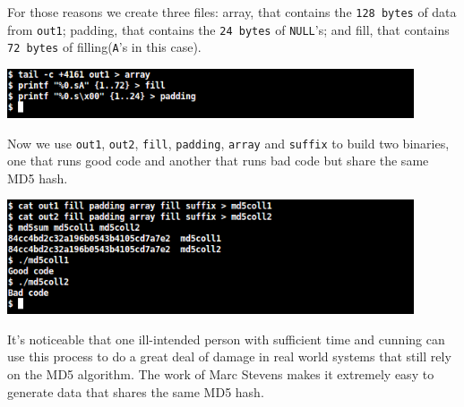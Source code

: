 \documentclass[a4paper]{article}
\begin{document}
\bigskip

For those reasons we create three files: array, that contains the \texttt{128 bytes} of data from \texttt{out1}; padding, that contains the \texttt{24 bytes} of \texttt{NULL}'s; and fill, that contains \texttt{72 bytes} of filling(\texttt{A}'s in this case).

\bigskip

\includegraphics[width=0.9\textwidth]{bash/md5collarrayoutarray.png}

\bigskip

Now we use \texttt{out1}, \texttt{out2}, \texttt{fill}, \texttt{padding}, \texttt{array} and \texttt{suffix} to build two binaries, one that runs good code and another that runs bad code but share the same MD5 hash.

\bigskip

\includegraphics[width=0.9\textwidth]{bash/md5collarraycat.png}

\bigskip

It's noticeable that one ill-intended person with sufficient time and cunning can use this process to do a great deal of damage in real world systems that still rely on the MD5 algorithm. The work of Marc Stevens makes it extremely easy to generate data that shares the same MD5 hash.

\newpage

\printbibliography
\end{document}
